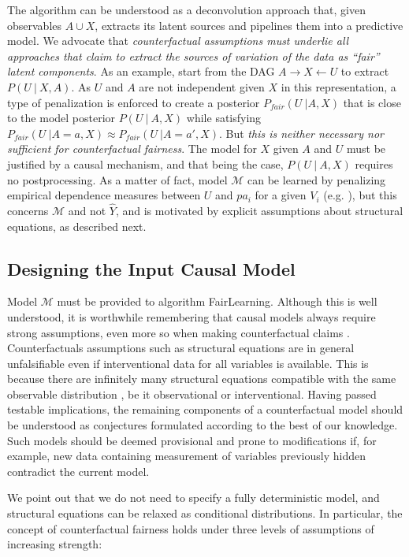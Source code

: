  The algorithm can be
understood as a deconvolution approach that, given observables $A \cup
X$, extracts its latent sources and pipelines them into a predictive
model. We advocate that \emph{counterfactual assumptions must underlie
  all approaches that claim to extract the sources of variation of the
  data as ``fair'' latent components}. As an example,
\citet{louizos2015variational} start from the DAG $A \rightarrow X
\leftarrow U$ to extract $P(U\ |\ X, A)$. As $U$ and $A$ are not
independent given $X$ in this representation, a type of penalization
is enforced to create a posterior $P_{fair}(U\ | A, X)$ that is close
to the model posterior $P(U\ |\ A, X)$ while satisfying $P_{fair}(U\ |
A = a, X) \approx P_{fair}(U\ | A = a', X)$. But {\it this is neither
  necessary nor sufficient for counterfactual fairness}. The model for
$X$ given $A$ and $U$ must be justified by a causal mechanism, and
that being the case, $P(U\ |\ A, X)$ requires no postprocessing. As a
matter of fact, model $\mathcal M$ can be learned by penalizing
empirical dependence measures between $U$ and $pa_i$ for a given $V_i$
(e.g. \citet{mooij:09}), but this concerns $\mathcal M$ and not $\hat Y$,
and is motivated by explicit assumptions about structural equations,
as described next.

\subsection{Designing the Input Causal Model}
\label{sec:limit-guide-model}

Model $\mathcal M$ must be provided to algorithm {\sc FairLearning}.
Although this is well understood, it is worthwhile remembering that
causal models always require strong assumptions, even more so when
making counterfactual claims \cite{dawid:00}. Counterfactuals
assumptions such as structural equations are in general unfalsifiable
even if interventional data for all variables is available. This is
because there are infinitely many structural equations compatible with
the same observable distribution \cite{pearl:00}, be it observational
or interventional. Having passed testable implications, the remaining
components of a counterfactual model should be understood as
conjectures formulated according to the best of our knowledge. Such
models should be deemed provisional and prone to modifications if, for
example, new data containing measurement of variables previously
hidden contradict the current model.

We point out that we do not need to specify a fully deterministic
model, and structural equations can be relaxed as conditional
distributions. In particular, the concept of counterfactual fairness
holds under three levels of assumptions of increasing strength:

